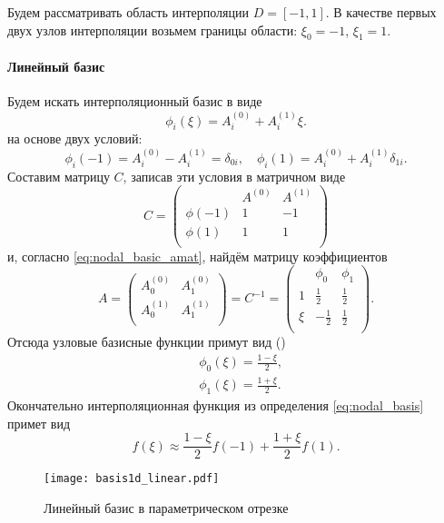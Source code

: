 \label{sec:segment_bases}
Будем рассматривать область интерполяции $D=[-1, 1]$.
В качестве первых двух узлов интерполяции возьмем границы области:
$\xi_0 = -1$, $\xi_1 = 1$.
\paragraph{Линейный базис}
Будем искать интерполяционный базис в виде
$$
\phi_i(\xi) = A_i^{(0)} + A_i^{(1)} \xi.
$$
на основе двух условий:
$$
\phi_i(-1) = A_i^{(0)} - A_i^{(1)} = \delta_{0i}, \quad \phi_i(1) = A_i^{(0)} + A_i^{(1)}\delta_{1i}.
$$
Составим матрицу $C$, записав эти условия в матричном виде
$$
C =
\left(
\begin{array}{l|rr}
      & A^{(0)} & A^{(1)}\\
\hline
\phi(-1) & 1 & -1 \\[5pt]
\phi(1) & 1 &  1 \\[5pt]
\end{array}
\right)
$$
и, согласно \cref{eq:nodal_basic_amat}, найдём матрицу коэффициентов
$$
A =
\left(
\begin{array}{cc}
A_0^{(0)} & A_1^{(0)} \\[5pt]
A_0^{(1)} & A_1^{(1)} \\[5pt]
\end{array}
\right) = C^{-1} =
\left(
\begin{array}{l|rr}
     & \phi_0   & \phi_1  \\
\hline
1    & \frac12  & \frac12 \\[5pt]
\xi  & -\frac12 & \frac12 \\[5pt]
\end{array}
\right).
$$
Отсюда узловые базисные функции примут вид ()
\begin{equation}
\label{eq:segment_linear_basis}
\begin{aligned}
&\phi_0(\xi) = \frac{1 - \xi}{2}, \\
&\phi_1(\xi) = \frac{1 + \xi}{2}.
\end{aligned}
\end{equation}
Окончательно интерполяционная функция из определения \cref{eq:nodal_basis}
примет вид
$$
f(\xi) \approx \frac{1 - \xi}{2} f(-1) + \frac{1 + \xi}{2} f(1).
$$
\begin{figure}[h!]
\centering
\texttt{[image: basis1d\_linear.pdf]}
\caption{Линейный базис в параметрическом отрезке}
\label{fig:basis1d_linear}
\end{figure}

